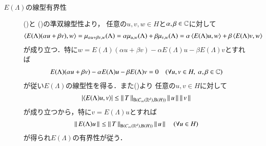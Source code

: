 \begin{prf}
\begin{description}
\begin{description}
					\item[$E(\Lambda)$の線型有界性]
						()と
						()の準双線型性より，
						任意の$u,v,w \in H$と$\alpha,\beta \in \mathbb{C}$に対して
						\begin{align}
							\inprod<E(\Lambda)(\alpha u + \beta v),w>
							= \mu_{\alpha u + \beta v, w}(\Lambda)
							= \alpha \mu_{u,w}(\Lambda) + \beta \mu_{v,w}(\Lambda)
							= \alpha \inprod<E(\Lambda)u,w> + \beta \inprod<E(\Lambda)v,w>
						\end{align}
						が成り立つ．特に$w = E(\Lambda)(\alpha u + \beta v) - \alpha E(\Lambda) u - \beta E(\Lambda) v$とすれば
						\begin{align}
							E(\Lambda)(\alpha u + \beta v) - \alpha E(\Lambda) u - \beta E(\Lambda) v = 0
							\quad (\forall u,v \in H,\ \alpha,\beta \in \mathbb{C})
						\end{align}
						が従い$E(\Lambda)$の線型性を得る．また()より
						任意の$u,v \in H$に対して
						\begin{align}
							\left| \inprod<E(\Lambda)u,v> \right| \leq \Norm{T}{\Bop{\cvan{\R^d}}{\selfBop{H} } } \Norm{u}{} \Norm{v}{}
						\end{align}
						が成り立つから，特に$v = E(\Lambda) u$とすれば
						\begin{align}
							\left\|\, E(\Lambda)u\, \right\|_{} \leq \left\|\, T\, \right\|_{\mathrm{B}(C_\infty (\mathbb{R}^d),\mathrm{B}(H) ) } \left\|\, u\, \right\|_{}
							\quad (\forall u \in H)
						\end{align}
						が得られ$E(\Lambda)$の有界性が従う．
				\end{description}
			

\end{description}
\end{prf}
